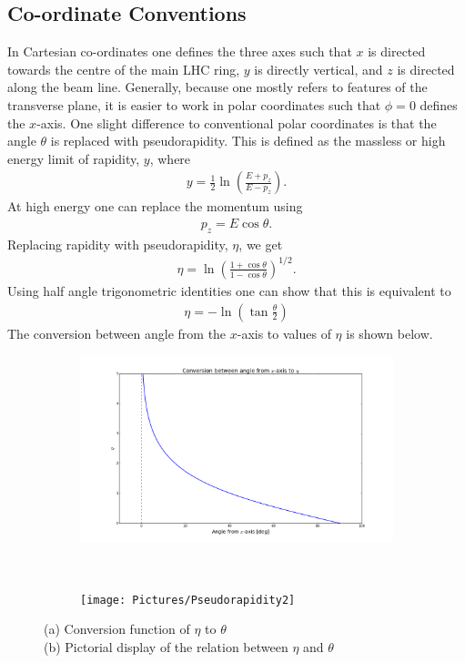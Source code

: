 \subsection{Co-ordinate Conventions}
In Cartesian co-ordinates one defines the three axes such that $x$ is directed towards the centre of the main LHC ring, $y$ is directly vertical, and $z$ is directed along the beam line.
Generally, because one mostly refers to features of the transverse plane, it is easier to work in polar coordinates such that $\phi=0$ defines the $x$-axis.
One slight difference to conventional polar coordinates is that the angle $\theta$ is replaced with pseudorapidity. 
This is defined as the massless or high energy limit of rapidity, $y$, where
\begin{align}
y = \frac{1}{2} \ln \left( \frac{E + p_{z}}{E - p_{z}} \right).
\end{align}
At high energy one can replace the momentum using
\begin{align}
p_{z} = E \cos \theta. 
\end{align}
Replacing rapidity with pseudorapidity, $\eta$, we get
\begin{align}
\eta = \ln \left( \frac{1 + \cos \theta}{1 - \cos \theta} \right)^{1/2}.
\end{align}
Using half angle trigonometric identities one can show that this is equivalent to
\begin{align}
\eta = - \ln \left( \tan \frac{\theta}{2} \right)
\end{align}
The conversion between angle from the $x$-axis to values of $\eta$ is shown below.

\begin{figure}[H]
    \centering
    \begin{subfigure}[b]{0.48\textwidth}
        \centering
        \includegraphics[width=\textwidth]{Pictures/etaConversion.png}
    \caption{}
    \end{subfigure}
    ~
    \begin{subfigure}[b]{0.48\textwidth}
        \centering
        \texttt{[image: Pictures/Pseudorapidity2]}
    \caption{}    
        \end{subfigure}
\caption{(a) Conversion function of $\eta$ to $\theta$ \\ (b) Pictorial display of the relation between $\eta$ and $\theta$}
\label{fig:etaConversion}
\end{figure}

